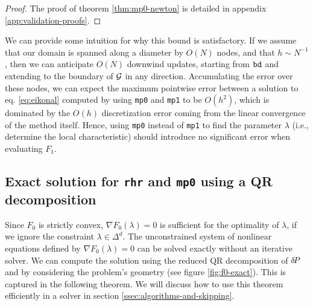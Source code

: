 \documentclass[smallcondensed]{svjour3}
\begin{document}
\begin{proof}
  The proof of theorem \ref{thm:mp0-newton} is detailed in appendix
  \ref{app:validation-proofs}.
\end{proof}

We can provide some intuition for why this bound is satisfactory. If
we assume that our domain is spanned along a diameter by $O(N)$ nodes,
and that $h \sim N^{-1}$, then we can anticipate $O(N)$ downwind
updates, starting from $\texttt{bd}$ and extending to the boundary of
$\mathcal{G}$ in any direction. Accumulating the error over these nodes, we
can expect the maximum pointwise error between a solution to eq.\@
\ref{eq:eikonal} computed by using \texttt{mp0} and \texttt{mp1} to be
$O(h^2)$, which is dominated by the $O(h)$ discretization error coming
from the linear convergence of the method itself. Hence, using
\texttt{mp0} instead of \texttt{mp1} to find the parameter $\lambda$
(i.e., determine the local characteristic) should introduce no
significant error when evaluating $F_1$.


\subsection{Exact solution for \texttt{rhr} and \texttt{mp0} using a
  QR decomposition}\label{ssec:exact-soln}

Since $F_0$ is strictly convex, $\nabla F_0(\lambda) = 0$ is
sufficient for the optimality of $\lambda$, if we ignore the
constraint $\lambda \in \Delta^d$. The unconstrained system of
nonlinear equations defined by $\nabla F_0(\lambda) = 0$ can be solved
exactly without an iterative solver. We can compute the solution using
the reduced QR decomposition of ${\delta \hspace{-0.14em} P}$ and by considering the
problem's geometry (see figure \ref{fig:f0-exact}). This is captured
in the following theorem. We will discuss how to use this theorem
efficiently in a solver in section\@
\ref{ssec:algorithms-and-skipping}.
\end{document}
